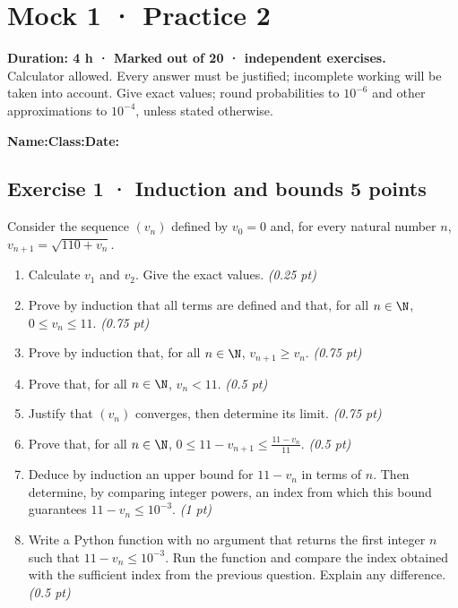 \fi

\mxnewpage{}\label{sujet:5-2}

\section*{Mock 1 · Practice 2}


\textbf{Duration: 4 h · Marked out of 20 ·  independent exercises.}\\Calculator allowed. Every answer must be justified; incomplete working will be taken into account. Give exact values; round probabilities to $10^{-6}$ and other approximations to $10^{-4}$, unless stated otherwise.

\smallskip\textbf{Name:}\enspace\dotfill\quad\textbf{Class:}\enspace\dotfill\quad\textbf{Date:}\enspace\dotfill

\subsection*{Exercise 1 · Induction and bounds \hfill 5 points}Consider the sequence $(v_n)$ defined by $v_0=0$ and, for every natural number $n$, $v_{n+1}=\sqrt{110+v_n}$.

\begin{enumerate}

\item Calculate $v_1$ and $v_2$. Give the exact values. \hfill\textit{(0.25 pt)}

\item Prove by induction that all terms are defined and that, for all $n\in\N$, $0\le v_n\le11$. \hfill\textit{(0.75 pt)}

\item Prove by induction that, for all $n\in\N$, $v_{n+1}\ge v_n$. \hfill\textit{(0.75 pt)}

\item Prove that, for all $n\in\N$, $v_n<11$. \hfill\textit{(0.5 pt)}

\item Justify that $(v_n)$ converges, then determine its limit. \hfill\textit{(0.75 pt)}

\item Prove that, for all $n\in\N$, $0\le 11-v_{n+1}\le\frac{11-v_n}{11}$. \hfill\textit{(0.5 pt)}

\item Deduce by induction an upper bound for $11-v_n$ in terms of $n$. Then determine, by comparing integer powers, an index from which this bound guarantees $11-v_n\le10^{-3}$. \hfill\textit{(1 pt)}

\item Write a Python function with no argument that returns the first integer $n$ such that $11-v_n\le10^{-3}$. Run the function and compare the index obtained with the sufficient index from the previous question. Explain any difference. \hfill\textit{(0.5 pt)}

\end{enumerate}

